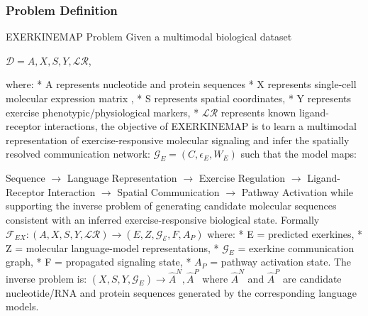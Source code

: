 \documentclass[11pt]{article}
\begin{document}
\subsubsection{Problem Definition}
EXERKINEMAP Problem
Given a multimodal biological dataset \newline

$\mathcal{D} = {A,X,S,Y,\mathcal{LR}}$, \newline

where: \newline
* A represents nucleotide and protein sequences \newline
* X represents single-cell molecular expression matrix , \newline
* S represents spatial coordinates, \newline
* Y represents exercise phenotypic/physiological markers, \newline
* $\mathcal{LR}$ represents known ligand-receptor interactions, \newline
the objective of EXERKINEMAP is to learn a multimodal representation of exercise-responsive molecular signaling and infer the spatially resolved communication network: $\mathcal{G}_E = (C,\epsilon_E, W_E)$ such that the model maps: 

Sequence  $\rightarrow$ Language Representation $\rightarrow$ Exercise Regulation  $\rightarrow$ Ligand-Receptor Interaction  $\rightarrow$ Spatial Communication  $\rightarrow$ Pathway Activation while supporting the inverse problem of generating candidate molecular sequences consistent with an inferred exercise-responsive biological state. Formally $\mathcal{F}_{EX}: (A, X, S, Y, \mathcal{LR})  \rightarrow (E,Z,\mathcal{G_E}, F, A_P)$ \newline
where: \newline
* E = predicted exerkines, \newline
* Z = molecular language-model representations, \newline
* $\mathcal{G}_E$ = exerkine communication graph, \newline
* F = propagated signaling state, \newline
* $A_P$ = pathway activation state. \newline
The inverse problem is: $(X,S,Y, \mathcal{G}_E) \rightarrow \hat{A}^N, \hat{A}^P$ where $\hat{A}^N$ and $\hat{A}^P$ are candidate nucleotide/RNA and protein sequences generated by the corresponding language models. 
\end{document}
